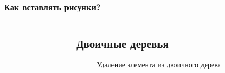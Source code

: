 \documentclass{beamer}
\begin{document}
\begin{frame}
\begin{columns}
\begin{column}{0.5\textwidth}
\begin{figure}[h!]
      \end{figure}
    \end{column}
  \end{columns}  
\end{frame}


\begin{frame}
  \frametitle{Как вставлять рисунки?}
  \begin{columns}
    \begin{column}{0.5\textwidth}
      \begin{figure}[h!]
      \end{figure}
    \end{column}
    \begin{column}{0.5\textwidth}
\section{Двоичные деревья}

\begin{figure}[h!]
  \caption{Удаление элемента из двоичного дерева}
  \label{delte_tree}
\end{figure}
    \end{column}
  \end{columns}  
\end{frame}
\end{document}
